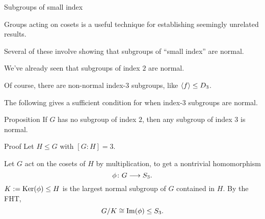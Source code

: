 \documentclass[8pt, handout]{beamer}
\newcommand{\Pause}{}      %
\begin{document}
\begin{frame}{Subgroups of small index}

  Groups acting on cosets is a useful technique for establishing
  seemingly unrelated results. \medskip\Pause

  Several of these involve showing that subgroups of ``small index''
  are normal. \medskip\Pause

  We've already seen that subgroups of index $2$ are normal. \medskip\Pause

  Of course, there are non-normal index-$3$ subgroups, like $\langle f\rangle\leq
  D_3$. \medskip\Pause

  The following gives a sufficient condition for when index-$3$
  subgroups are normal.
  
  \smallskip\Pause
  
  \begin{block}{Proposition}
    If $G$ has no subgroup of index $2$, then any subgroup of index
    $3$ is normal.
  \end{block}
  
  \begin{exampleblock}{Proof} \Pause
    Let $H\leq G$ with $[G:H]=3$. \medskip\Pause
    
    Let $G$ act on the cosets of $H$ by multiplication, to get a
    nontrivial homomorphism
    \[
    \phi\colon G\longrightarrow S_3.
    \]
    \Pause $K:=\operatorname{Ker}(\phi)\leq H$ is the largest normal
    subgroup of $G$ contained in $H$. \Pause By the FHT,
    \[
    G/K\cong\operatorname{Im}(\phi)\leq S_3. 
    \]
  \end{exampleblock}
  
\end{frame}

\end{document}
